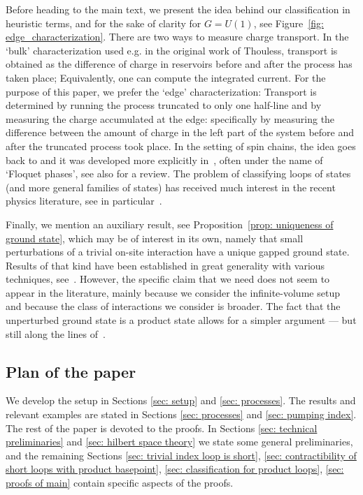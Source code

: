 Before heading to the main text, we present the idea behind our classification in heuristic terms, and for the sake of clarity for $G=U(1)$, see Figure~\ref{fig: edge_characterization}. There are two ways to measure charge transport. In the `bulk' characterization used e.g. in the original work of Thouless, transport is obtained as the difference of charge in reservoirs before and after the process has taken place; Equivalently, one can compute the integrated current. For the purpose of this paper, we prefer the `edge' characterization: Transport is determined by running the process truncated to only one half-line and by measuring the charge accumulated at the edge: specifically by measuring the difference between the amount of charge in the left part of the system before and after the truncated process took place.  In the setting of spin chains, the idea goes back to \cite{KitaevConf} and it was developed more explicitly in~\cite{Else_2014,Else_2016,potter2016classification,von2016phase}, often under the name of `Floquet phases', see also \cite{Xiong_2018} for a review. The problem of classifying loops of states (and more general families of states) has received much interest in the recent physics literature, see in particular~\cite{KunoHatsugai,kapustin2022local,wen2021flow,Aasen_2022,shiozaki2022adiabatic}. 

Finally, we mention an auxiliary result, see Proposition~\ref{prop: uniqueness of ground state}, which may be of interest in its own, namely that small perturbations of a trivial on-site interaction have a unique gapped ground state. Results of that kind have been established in great generality with various techniques, see~\cite{yarotsky2006ground,bravyi2010topological,michalakis2013stability,nachtergaele2020quasi,del2021lie}. However, the specific claim that we need does not seem to appear in the literature, mainly because we consider the infinite-volume setup and because the class of interactions we consider is broader. The fact that the unperturbed ground state is a product state allows for a simpler argument --- but still along the lines of~\cite{michalakis2013stability}.

%
%
%
\subsection*{Plan of the paper} We develop the setup in Sections \ref{sec: setup} and \ref{sec: processes}. The results and relevant examples are stated in Sections \ref{sec: processes} and \ref{sec: pumping index}.  The rest of the paper is devoted to the proofs. In Sections \ref{sec: technical preliminaries} and \ref{sec: hilbert space theory} we state some general preliminaries, and the remaining Sections \ref{sec: trivial index loop is short}, \ref{sec: contractibility of short loops with product basepoint}, \ref{sec: classification for product loops}, \ref{sec: proofs of main} contain specific aspects of the proofs. 



